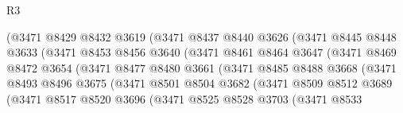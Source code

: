 \begin{lexlean}{R3}
\begin{coremodule}
                            (@3471
                              @8429
                              @8432
                              @3619
                              (@3471
                                @8437
                                @8440
                                @3626
                                (@3471
                                  @8445
                                  @8448
                                  @3633
                                  (@3471
                                    @8453
                                    @8456
                                    @3640
                                    (@3471
                                      @8461
                                      @8464
                                      @3647
                                      (@3471
                                        @8469
                                        @8472
                                        @3654
                                        (@3471
                                          @8477
                                          @8480
                                          @3661
                                          (@3471
                                            @8485
                                            @8488
                                            @3668
                                            (@3471
                                              @8493
                                              @8496
                                              @3675
                                              (@3471
                                                @8501
                                                @8504
                                                @3682
                                                (@3471
                                                  @8509
                                                  @8512
                                                  @3689
                                                  (@3471
                                                    @8517
                                                    @8520
                                                    @3696
                                                    (@3471
                                                      @8525
                                                      @8528
                                                      @3703
                                                      (@3471
                                                        @8533

\end{coremodule}
\end{lexlean}
